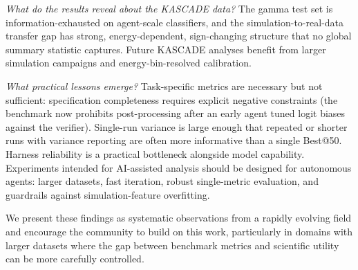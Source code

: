 \documentclass[universe,article,submit,pdftex,oneauthor]{Definitions/mdpi}
\begin{document}
\textit{What do the results reveal about the KASCADE data?} The gamma test set is information-exhausted on agent-scale classifiers, and the simulation-to-real-data transfer gap has strong, energy-dependent, sign-changing structure that no global summary statistic captures. Future KASCADE analyses benefit from larger simulation campaigns and energy-bin-resolved calibration.

\textit{What practical lessons emerge?} Task-specific metrics are necessary but not sufficient: specification completeness requires explicit negative constraints (the benchmark now prohibits post-processing after an early agent tuned logit biases against the verifier). Single-run variance is large enough that repeated or shorter runs with variance reporting are often more informative than a single Best@50. Harness reliability is a practical bottleneck alongside model capability. Experiments intended for AI-assisted analysis should be designed for autonomous agents: larger datasets, fast iteration, robust single-metric evaluation, and guardrails against simulation-feature overfitting.

We present these findings as systematic observations from a rapidly evolving field and encourage the community to build on this work, particularly in domains with larger datasets where the gap between benchmark metrics and scientific utility can be more carefully controlled.


\vspace{6pt}





\end{document}
